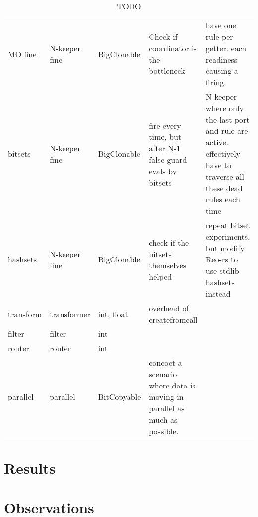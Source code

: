 \begin{landscape}
\begin{table}[p!]
\begin{adjustbox}{width=19cm}
\begin{tabular}{l|ll|p{46mm}p{67mm}}
		MO fine 			  & N-keeper fine  & BigClonable & Check if coordinator is the bottleneck                                   & have one rule per getter. each readiness causing a firing.                                                                                     \\
		bitsets               & N-keeper fine  & BigClonable & fire every time, but after N-1 false guard evals by bitsets              & N-keeper where only the last port and rule are active. effectively have to traverse all these dead rules each time                             \\
		hashsets              & N-keeper fine  & BigClonable & check if the bitsets themselves helped                                   & repeat bitset experiments, but modify Reo-rs to use stdlib hashsets instead                                                                    \\
		transform             & transformer    & int, float  & overhead of createfromcall                                               &                                                                                                                                                \\
		filter                & filter         & int         &                                                                          &                                                                                                                                                \\
		router                & router         & int         &                                                                          &                                                                                                                                                \\
		parallel              & parallel       & BitCopyable & concoct a scenario where data is moving in parallel as much as possible. &                                                                                                                                               
	
\end{tabular}
\end{adjustbox}
\caption[TODO]{TODO}	
\end{table}
\end{landscape}

\section{Results}
\section{Observations}
